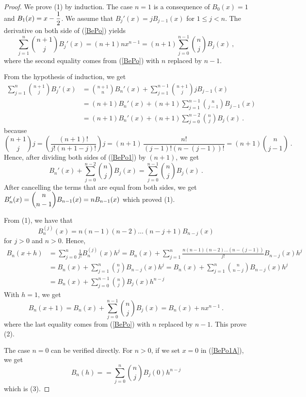 \begin{proof}
 We prove (1) by induction.  The case $n=1$ is a consequence of
$B_0(x) = 1$ and $\displaystyle B_1(x) = x - \frac{1}{2}$.  We assume
that $B_j'(x) = j B_{j-1}(x)$ for $1 \leq j < n$.  The derivative on both
side of (\ref{BePo}) yields
\begin{equation} \label{BePo1}
\sum_{j=1}^n \binom{n+1}{j} B_j'(x) = (n+1)nx^{n-1}
= (n+1) \sum_{j=0}^{n-1} \binom{n}{j} B_j(x) \ ,
\end{equation}
where the second equality comes from (\ref{BePo}) with $n$ replaced by
$n-1$.

From the hypothesis of induction, we get
\begin{align*}
\sum_{j=1}^n \binom{n+1}{j} B_j'(x)
&= \binom{n+1}{n} B_n'(x) + \sum_{j=1}^{n-1} \binom{n+1}{j} j B_{j-1}(x) \\
&= (n+1) B_n'(x) + (n+1) \sum_{j=1}^{n-1} \binom{n}{j-1} B_{j-1}(x) \\
&= (n+1) B_n'(x) + (n+1) \sum_{j=0}^{n-2} \binom{n}{j} B_{j}(x) \ .
\end{align*}
because
\[
\binom{n+1}{j} j = \left(\frac{(n+1)!}{j!(n+1-j)!}\right) j
= (n+1)\, \frac{n!}{(j-1)!(n-(j-1))!} = (n+1) \binom{n}{j-1} \ .
\]
Hence, after dividing both sides of (\ref{BePo1}) by $(n+1)$, we get
\[
B_n'(x) + \sum_{j=0}^{n-2} \binom{n}{j} B_{j}(x)
= \sum_{j=0}^{n-1} \binom{n}{j} B_j(x) \ .
\]
After cancelling the terms that are equal from both sides, we get
$\displaystyle B_n'(x) = \binom{n}{n-1} B_{n-1}(x) = nB_{n-1}(x)$
which proved (1).

  From (1), we have that
\[
B_n^{(j)}(x) = n(n-1)(n-2)\ldots(n-j+1)B_{n-j}(x)
\]
for $j>0$ and $n>0$.  Hence,
\begin{align}
B_n(x+h) &= \sum_{j=0}^n \frac{1}{j!} B_n^{(j)}(x) h^j
= B_n(x) +
\sum_{j=1}^n \frac{n(n-1)(n-2)\ldots(n-(j-1))}{j!} B_{n-j}(x) h^j
\nonumber \\
&= B_n(x) + \sum_{j=1}^n \binom{n}{j} B_{n-j}(x) h^j
= B_n(x) + \sum_{j=1}^n \binom{n}{n-j} B_{n-j}(x) h^j \nonumber \\
&= B_n(x) + \sum_{j=0}^{n-1} \binom{n}{j} B_{j}(x) h^{n-j}
\label{BePo1A}
\end{align}
With $h=1$, we get
\[
B_n(x+1) = B_n(x) + \sum_{j=0}^{n-1} \binom{n}{j} B_{j}(x)
= B_n(x) + nx^{n-1} \ .
\]
where the last equality comes from (\ref{BePo}) with $n$ replaced by
$n-1$.  This prove (2).

 The case $n=0$ can be verified directly.  For $n>0$, if we
set $x=0$ in (\ref{BePo1A}), we get
\[
B_n(h) = = \sum_{j=0}^n \binom{n}{j} B_j(0) h^{n-j}
\]
which is (3).


\end{proof}
